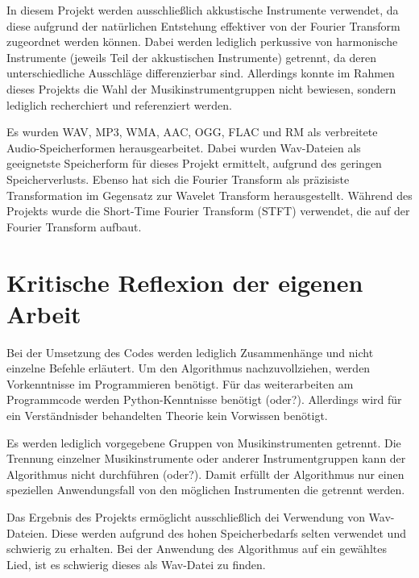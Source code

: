 In diesem Projekt werden ausschließlich akkustische Instrumente verwendet, da diese aufgrund der natürlichen Entstehung effektiver von der Fourier Transform zugeordnet werden können.
Dabei werden lediglich perkussive von harmonische Instrumente (jeweils Teil der akkustischen Instrumente) getrennt, da deren unterschiedliche Ausschläge differenzierbar sind.
Allerdings konnte im Rahmen dieses Projekts die Wahl der Musikinstrumentgruppen nicht bewiesen, sondern lediglich recherchiert und referenziert werden.

\par

Es wurden WAV, MP3, WMA, AAC, OGG, FLAC und RM als verbreitete Audio-Speicherformen herausgearbeitet.
Dabei wurden Wav-Dateien als geeignetste Speicherform für dieses Projekt ermittelt, aufgrund des geringen Speicherverlusts.
Ebenso hat sich die Fourier Transform als präzisiste Transformation im Gegensatz zur Wavelet Transform herausgestellt.
Während des Projekts wurde die Short-Time Fourier Transform (STFT) verwendet, die auf der Fourier Transform aufbaut.

%
\section{Kritische Reflexion der eigenen Arbeit}
%

Bei der Umsetzung des Codes werden lediglich Zusammenhänge und nicht einzelne Befehle erläutert.
Um den Algorithmus nachzuvollziehen, werden Vorkenntnisse im Programmieren benötigt.
Für das weiterarbeiten am Programmcode werden Python-Kenntnisse benötigt (oder?).
Allerdings wird für ein Verständnisder behandelten Theorie kein Vorwissen benötigt.

\par

Es werden lediglich vorgegebene Gruppen von Musikinstrumenten getrennt.
Die Trennung einzelner Musikinstrumente oder anderer Instrumentgruppen kann der Algorithmus nicht durchführen (oder?).
Damit erfüllt der Algorithmus nur einen speziellen Anwendungsfall von den möglichen Instrumenten die getrennt werden.

\par

Das Ergebnis des Projekts ermöglicht ausschließlich dei Verwendung von Wav-Dateien.
Diese werden aufgrund des hohen Speicherbedarfs selten verwendet und schwierig zu erhalten.
Bei der Anwendung des Algorithmus auf ein gewähltes Lied, ist es schwierig dieses als Wav-Datei zu finden.

